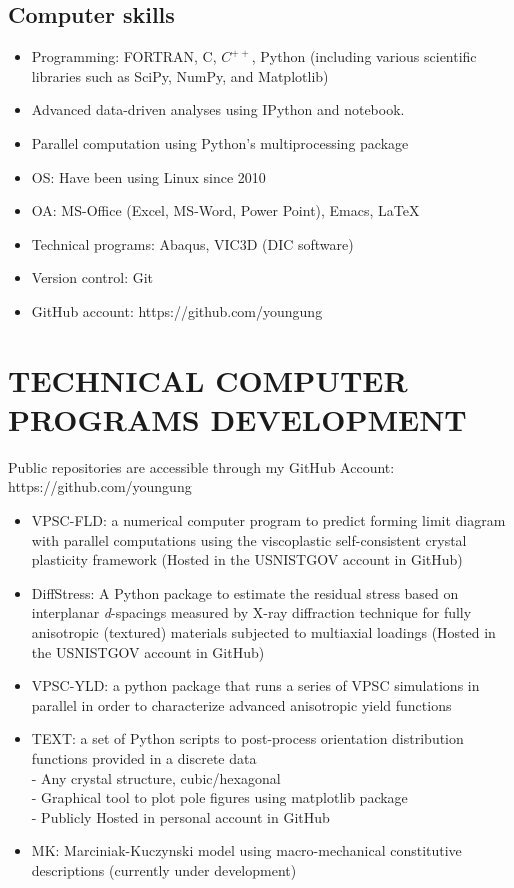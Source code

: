 \documentclass{res}
\begin{document}
\begin{resume}
  \subsection{Computer skills}
  \begin{itemize}
  \item Programming: FORTRAN, C, $C^{++}$, Python (including various scientific libraries such as SciPy, NumPy, and Matplotlib)
  \item Advanced data-driven analyses using IPython and notebook.
  \item Parallel computation using Python's multiprocessing package
  \item OS: Have been using Linux since 2010
  \item OA: MS-Office (Excel, MS-Word, Power Point), Emacs, \LaTeX
  \item Technical programs: Abaqus, VIC3D (DIC software)
  \item Version control: Git
  \item GitHub account: https://github.com/youngung
  \end{itemize}

  \section{TECHNICAL COMPUTER PROGRAMS DEVELOPMENT}
  Public repositories are accessible through my GitHub Account: https://github.com/youngung
  \begin{itemize}
  \item VPSC-FLD: a numerical computer program to predict forming limit diagram with parallel computations using the viscoplastic self-consistent crystal plasticity framework (Hosted in the USNISTGOV account in GitHub) \\
  \item DiffStress: A Python package to estimate the residual stress based on interplanar \emph{d}-spacings measured by X-ray diffraction technique for fully anisotropic (textured) materials subjected to multiaxial loadings (Hosted in the USNISTGOV account in GitHub) \\
  \item VPSC-YLD: a python package that runs a series of VPSC simulations in parallel in order to characterize advanced anisotropic yield functions \\
  \item TEXT: a set of Python scripts to post-process orientation distribution functions provided in a discrete data \\
    - Any crystal structure, cubic/hexagonal\\
    - Graphical tool to plot pole figures using matplotlib package\\
    - Publicly Hosted in personal account in GitHub\\
  \item MK: Marciniak-Kuczynski model using macro-mechanical constitutive descriptions (currently under development)
  \end{itemize}


\end{resume}
\end{document}
